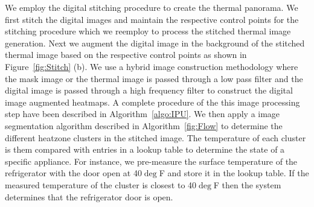 
We employ the digital stitching procedure to create the thermal panorama. We first stitch the digital images and maintain the respective control points for the stitching procedure which we reemploy to process the stitched thermal image generation. Next we augment the digital image in the background of the stitched thermal image based on the respective control points as shown in Figure~\ref{fig:Stitch} (b). We use a hybrid image construction methodology where the mask image or the thermal image is passed through a low pass filter and the digital image is passed through a high frequency filter to construct the digital image augmented heatmaps. A complete procedure of the this image processing step have been described in Algorithm~\ref{algo:IPU}. We then apply a image segmentation algorithm described in Algorithm~\ref{fig:Flow} to determine the different heatzone
clusters in the stitched image. The temperature of each cluster is them compared with entries in a lookup table to determine the state of a specific appliance. For instance, we pre-measure the surface temperature of the refrigerator with the door open at 40$\deg$F and store it in the lookup table. If the measured temperature of the cluster is closest to 40$\deg$F then the system determines that the refrigerator door is open.


